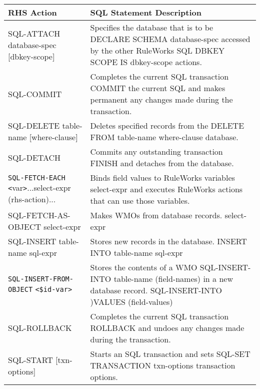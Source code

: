 \begin{table}
  \begin{tabularx}{\columnwidth}{XX}
    \toprule
    RHS Action & SQL Statement Description \\
    \midrule
    SQL-ATTACH database-spec [dbkey-scope] & Specifies the database that is
                                             to be DECLARE SCHEMA database-spec  accessed
                                             by the other RuleWorks SQL DBKEY SCOPE IS
                                             dbkey-scope  actions.  \\    
    SQL-COMMIT & Completes the current SQL
                 transaction
                 COMMIT  the current SQL and makes permanent
                 any changes made during the
                 transaction. \\

     SQL-DELETE table-name [where-clause]&  Deletes
     specified records from the
     DELETE FROM table-name where-clause  database. \\

     SQL-DETACH  & Commits any outstanding
     transaction
     FINISH  and detaches from the database. \\

     \verb|SQL-FETCH-EACH| \verb|<|var\verb|>|...select-expr
     (rhs-action)... & Binds field values to
     RuleWorks variables
     select-expr  and executes RuleWorks actions
     that can
      use those variables. \\

     SQL-FETCH-AS-OBJECT select-expr  & Makes WMOs
     from database records.
     select-expr \\

     SQL-INSERT table-name sql-expr &  Stores new
     records in the database.
     INSERT INTO table-name sql-expr \\

     \verb|SQL-INSERT-FROM-OBJECT| \verb|<$id-var>| & Stores the
     contents of a WMO
     SQL-INSERT-INTO table-name (field-names) in a
     new database record.
     SQL-INSERT-INTO )VALUES (field-values) \\

     SQL-ROLLBACK  & Completes the current SQL
     transaction
     ROLLBACK  and undoes any changes made during
     the
      transaction. \\

     SQL-START [txn-options] & Starts an SQL
     transaction and sets
     SQL-SET TRANSACTION txn-options  transaction
     options. \\


\end{tabularx}
\end{table}
